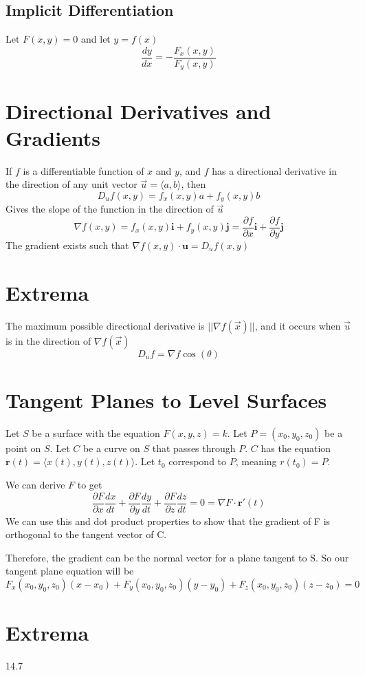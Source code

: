 \documentclass{report}
\newcommand{\pdif}[2]{ \frac{\partial #1}{ \partial #2} }
\begin{document}
\subsection{Implicit Differentiation}
Let $F(x, y) = 0$ and let $y = f(x)$
$$
\frac{dy}{dx} = - \frac{F_x(x, y)}{F_y(x, y)}
$$

\section{Directional Derivatives and Gradients}
If $f$ is a differentiable function of $x$ and $y$, and $f$ has a directional derivative in the direction of any unit vector $\vec{u} = \langle a, b \rangle$, then
$$
D_uf(x, y) = f_x(x, y)a + f_y(x, y)b
$$
Gives the slope of the function in the direction of $\vec{u}$
$$
\nabla f(x, y) = f_x(x, y) \mathbf{i} + f_y(x, y) \mathbf{j} = \pdif{f}{x}\mathbf{i} + \pdif{f}{y} \mathbf{j}
$$
The gradient exists such that $\nabla f(x, y) \cdot \mathbf{u} = D_u f(x, y)$

\section{Extrema}
The maximum possible directional derivative is $||\nabla f(\vec{x})||$, and it occurs when $\vec{u}$ is in the direction of $\nabla f(\vec{x})$
$$
D_uf = \nabla f \cos(\theta)
$$

\section{Tangent Planes to Level Surfaces}
Let $S$ be a surface with the equation $F(x, y, z) = k$. Let $P = (x_0, y_0, z_0)$ be a point on $S$. 
Let $C$ be a curve on $S$ that passes through $P$. $C$ has the equation $\mathbf{r}(t) = \langle x(t), y(t), z(t) \rangle$. Let $t_0$ correspond to $P$, meaning $r(t_0) = P$.

We can derive $F$ to get
$$
\pdif{F}{x} \frac{dx}{dt} + \pdif{F}{y} \frac{dy}{dt} + \pdif{F}{z} \frac{dz}{dt} = 0 = \nabla F \cdot \mathbf{r}'(t)
$$
We can use this and dot product properties to show that the gradient of F is orthogonal to the tangent vector of C.

Therefore, the gradient can be the normal vector for a plane tangent to S. So our tangent plane equation will be
$$
F_x(x_0, y_0, z_0)(x-x_0) +
F_y(x_0, y_0, z_0)(y-y_0) +
F_z(x_0, y_0, z_0)(z-z_0) =
0
$$

\section{Extrema}
14.7
\end{document}
